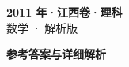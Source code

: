 \documentclass[zihao=-4, a4paper]{ctexart}
\begin{document}
\begin{center}
  {\Large\bfseries 2011 年·江西卷·理科}\\[4pt]
  {\large 数学 · 解析版}
\end{center}
\medskip
{}

\clearpage
{}
\begin{center}{\Large\bfseries 参考答案与详细解析}\end{center}
\medskip

\end{document}
